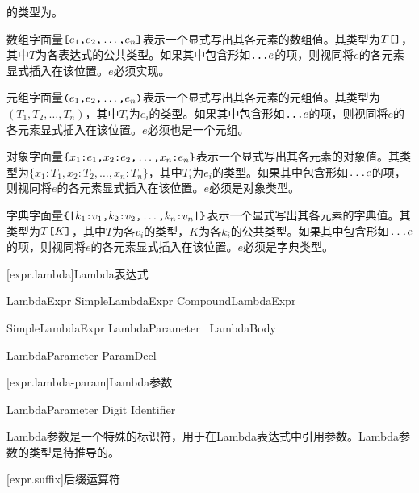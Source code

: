 \pnum
\tcode{()}的类型为。

\pnum
数组字面量$\texttt{[}e_1\texttt{,} e_2\texttt{,} \ldots\texttt{,} e_n\texttt{]}$表示一个显式写出其各元素的数组值。其类型为$T\texttt{[]}$，其中$T$为各表达式的公共类型。如果其中包含形如$\texttt{...}e$的项，则视同将$e$的各元素显式插入在该位置。$e$必须实现。

\pnum
元组字面量$\texttt{(}e_1\texttt{,} e_2\texttt{,} \ldots\texttt{,} e_n\texttt{)}$表示一个显式写出其各元素的元组值。其类型为$(T_1, T_2, \ldots, T_n)$，其中$T_i$为$e_i$的类型。如果其中包含形如$\texttt{...}e$的项，则视同将$e$的各元素显式插入在该位置。$e$必须也是一个元组。

\pnum
对象字面量$\texttt{\{}x_1\texttt{:} e_1\texttt{,} x_2\texttt{:} e_2\texttt{,} \ldots\texttt{,} x_n\texttt{:} e_n\texttt{\}}$表示一个显式写出其各元素的对象值。其类型为$\{x_1: T_1, x_2: T_2, \ldots, x_n: T_n\}$，其中$T_i$为$e_i$的类型。如果其中包含形如$\texttt{...}e$的项，则视同将$e$的各元素显式插入在该位置。$e$必须是对象类型。

\pnum
字典字面量$\texttt{\{|}k_1\texttt{:} v_1\texttt{,} k_2\texttt{:} v_2\texttt{,} \ldots\texttt{,} k_n\texttt{:} v_n\texttt{|\}}$表示一个显式写出其各元素的字典值。其类型为$T\texttt{[}K\texttt{]}$，其中$T$为各$v_i$的类型，$K$为各$k_i$的公共类型。如果其中包含形如$\texttt{...}e$的项，则视同将$e$的各元素显式插入在该位置。$e$必须是字典类型。

[expr.lambda]{Lambda表达式}

\begin{bnf}{LambdaExpr}
    SimpleLambdaExpr \br
    CompoundLambdaExpr
\end{bnf}

\begin{bnf}{SimpleLambdaExpr}
    LambdaParameter\bnfq\ \terminal{=>} LambdaBody
\end{bnf}

\begin{bnf}{LambdaParameter}
    ParamDecl
\end{bnf}

[expr.lambda-param]{Lambda参数}

\begin{bnf}{LambdaParameter}
    \terminal{\$} Digit\bnfp \br
    \terminal{\$} Identifier
\end{bnf}

\pnum
Lambda参数是一个特殊的标识符，用于在Lambda表达式中引用参数。Lambda参数的类型是待推导的。

[expr.suffix]{后缀运算符}

